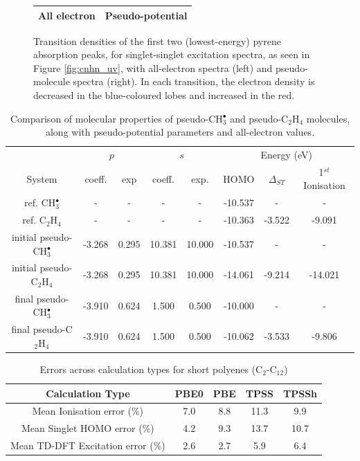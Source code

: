 \documentclass[12pt]{article}
\begin{document}
\begin{figure}
\begin{tabular}{|c|c|}
\hline
All electron & Pseudo-potential\\
\hline
\end{tabular}
\caption{Transition densities of the first two (lowest-energy) pyrene absorption peaks, for singlet-singlet excitation spectra, as seen in Figure \ref{fig:cnhn_uv}, with all-electron spectra (left) and pseudo-molecule spectra (right). In each transition, the electron density is decreased in the blue-coloured lobes and increased in the red.}
\label{fig:transitiondensities}
\end{figure}

\clearpage


\begin{table}[h]
\caption{\label{table:potential_params} Comparison of molecular properties of pseudo-CH$^{\bullet}_{3}$ and pseudo-C$_{2}$H$_{4}$ molecules, along with pseudo-potential parameters and all-electron values.}
\begin{tabular}{c | c c c c | c c c}
\hline
 & \multicolumn{2}{c}{$p$} & \multicolumn{2}{c}{$s$} & \multicolumn{3}{|c}{Energy (eV)} \\
System & coeff. & exp & coeff. & exp. & HOMO & $\Delta_{ST}$ & 1$^{st}$ Ionisation \\
\hline
ref. CH$^{\bullet}_{3}$ & - & - & - & - & -10.537 & - & - \\
ref. C$_{2}$H$_{4}$ & - & - & - & - & -10.363 & -3.522 & -9.091 \\
\hline
initial pseudo-CH$^{\bullet}_{3}$ & -3.268 & 0.295 & 10.381 & 10.000 & -10.537 & - & - \\
initial pseudo-C$_{2}$H$_{4}$ & -3.268 & 0.295 & 10.381 & 10.000 & -14.061 & -9.214 & -14.021\\
\hline
final pseudo-CH$^{\bullet}_{3}$ & -3.910 & 0.624 & 1.500 & 0.500 & -10.000 & - & - \\
final pseudo-C$_{2}$H$_{4}$ & -3.910 & 0.624 & 1.500 & 0.500 & -10.062 & -3.533 & -9.806 \\
\hline
\end{tabular}
\end{table}


\newpage

\begin{table}[h]
\caption{Errors across calculation types for short polyenes (C\(_{2}\)-C\(_{12}\))}
\begin{tabular}{c c c c c }
\hline
Calculation Type & PBE0 & PBE & TPSS & TPSSh \\
\hline
Mean Ionisation  error (\%) & 7.0 & 8.8 & 11.3 & 9.9 \\
Mean Singlet HOMO  error (\%) & 4.2 & 9.3 & 13.7 & 10.7 \\
Mean TD-DFT Excitation error (\%) & 2.6 & 2.7 & 5.9 & 6.4 \\ 
\hline
\end{tabular}
\label{table:alkene_errors}
\end{table}
\end{document}
